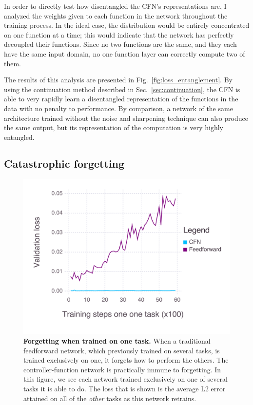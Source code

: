 \documentclass[12pt,twoside]{mitthesis}
\begin{document}
In order to directly test how disentangled the CFN's representations
are, I analyzed the weights given to each function in the network
throughout the training process. In the ideal case, the distribution
would be entirely concentrated on one function at a time; this would
indicate that the network has perfectly decoupled their functions. Since
no two functions are the same, and they each have the same input domain,
no one function layer can correctly compute two of them.

The results of this analysis are presented in
Fig.~\ref{fig:loss_entanglement}. By using the continuation method
described in Sec.~\ref{sec:continuation}, the CFN is able to very
rapidly learn a disentangled representation of the functions in the data
with no penalty to performance. By comparison, a network of the same
architecture trained without the noise and sharpening technique can also
produce the same output, but its representation of the computation is
very highly entangled.

\subsection{Catastrophic forgetting}\label{catastrophic-forgetting-1}

\begin{figure}[htbp]
\centering
\includegraphics{figures/forgetting.png}
\caption{\label{fig:forgetting}\textbf{Forgetting when trained on one
task.} When a traditional feedforward network, which previously trained
on several tasks, is trained exclusively on one, it forgets how to
perform the others. The controller-function network is practically
immune to forgetting. In this figure, we see each network trained
exclusively on one of several tasks it is able to do. The loss that is
shown is the average L2 error attained on all of the \emph{other} tasks
as this network retrains.}
\end{figure}
\end{document}
